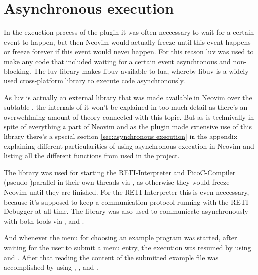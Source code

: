\documentclass{report}
\begin{document}

\section{Asynchronous execution}
\label{sec:asynchronous execution with libuv}

In the exeuction process of the plugin it was often neccessary to wait for a certain event to happen, but then Neovim would actually freeze until this event happens or freeze forever if this event would never happen. For this reason \alert{luv}\cite{LuvitLuvBare} was used to make any code that included waiting for a certain event asynchronous and non-blocking. The luv library makes \alert{libuv}\cite{LibuvLibuvCrossplatform} available to lua, whereby libuv is a widely used cross-platform library to execute code asynchronously.

As luv is actually an external library that was made available in Neovim over the subtable , the internals of it won't be explained in too much detail as there's an overwehlming amount of theory connected with this topic. But as  is technivally in spite of everything a part of Neovim and as the plugin made extensive use of this library there's a special section \ref{sec:asynchronous execution} in the appendix explaining different particularities of using asynchronous execution in Neovim and listing all the different functions from  used in the project.

The library was used for starting the RETI-Interpreter and PicoC-Compiler \alert{(pseudo-)parallel} in their own \alert{threads} via , as otherwise they would freeze Neovim until they are finished. For the RETI-Interpreter this is even neccessary, because it's supposed to keep a communication protocol running with the RETI-Debugger at all time. The library was also used to communicate asynchronously with both tools via ,  and . 

And whenever the menu for choosing an example program was started, after waiting for the user to submit a menu entry, the execution was resumed by using  and . After that reading the content of the submitted example file was accomplished by using , ,  and . 
\end{document}
